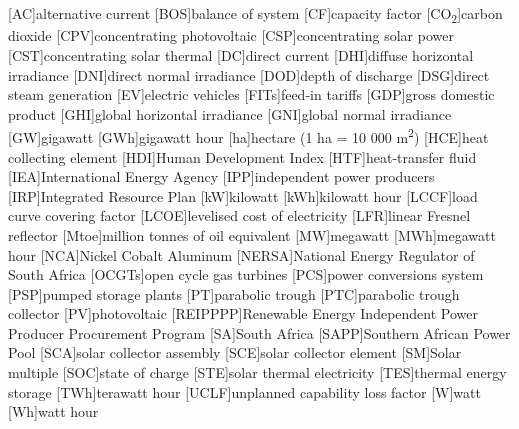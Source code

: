 {}
\chapter*{\listacroname}
\begin{acronym}[XXXXX]
  	[AC]{alternative current}
  	[BOS]{balance of system}
  	[CF]{capacity factor}
  	[CO\textsubscript{2}]{carbon dioxide}
    [CPV]{concentrating photovoltaic}
    [CSP]{concentrating solar power}
    [CST]{concentrating solar thermal} 
    [DC]{direct current}
    [DHI]{diffuse horizontal irradiance}
    [DNI]{direct normal irradiance}
	[DOD]{depth of discharge}
    [DSG]{direct steam generation}
    [EV]{electric vehicles}
    [FITs]{feed-in tariffs} 
    [GDP]{gross domestic product}
    [GHI]{global horizontal irradiance}
    [GNI]{global normal irradiance}
    [GW]{gigawatt}
    [GWh]{gigawatt hour} 
    [ha]{hectare (1 ha = 10 000 m\textsuperscript{2})} 
    [HCE]{heat collecting element}
    [HDI]{Human Development Index}
    [HTF]{heat-transfer fluid} 
    [IEA]{International Energy Agency}
    [IPP]{independent power producers}
    [IRP]{Integrated Resource Plan}
    [kW]{kilowatt}
    [kWh]{kilowatt hour}
    [LCCF]{load curve covering factor}
    [LCOE]{levelised cost of electricity}
    [LFR]{linear Fresnel reflector}
    [Mtoe]{million tonnes of oil equivalent}
    [MW]{megawatt}
    [MWh]{megawatt hour}
    [NCA]{Nickel Cobalt Aluminum}
    [NERSA]{National Energy Regulator of South Africa}
    [OCGTs]{open cycle gas turbines}
    [PCS]{power conversions system}
    [PSP]{pumped storage plants}
    [PT]{parabolic trough}
    [PTC]{parabolic trough collector}
    [PV]{photovoltaic}
    [REIPPPP]{Renewable Energy Independent Power Producer Procurement Program}
    [SA]{South Africa}
    [SAPP]{Southern African Power Pool}
    [SCA]{solar collector assembly}
    [SCE]{solar collector element}
    [SM]{Solar multiple}
    [SOC]{state of charge}
    [STE]{solar thermal electricity}
    [TES]{thermal energy storage}
    [TWh]{terawatt hour}
    [UCLF]{unplanned capability loss factor}
    [W]{watt}
    [Wh]{watt hour}
\end{acronym}
